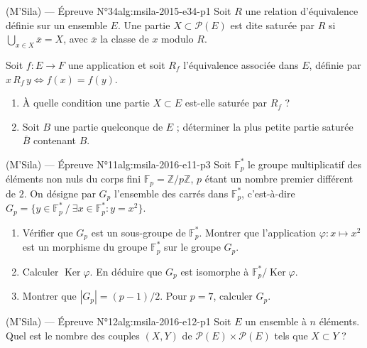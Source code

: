 \begin{problem}{(M'Sila) — Épreuve N°34}{alg:msila-2015-e34-p1}
Soit $R$ une relation d'équivalence définie sur un ensemble $E$. Une partie
$X\subset\mathcal P(E)$ est dite saturée par $R$ si
$\bigcup_{x\in X}\overline{x}=X$, avec $\overline{x}$ la classe de $x$ modulo $R$.

Soit $f:E\to F$ une application et soit $R_f$ l'équivalence associée dans $E$,
définie par $x\,R_f\,y\Longleftrightarrow f(x)=f(y)$.
\begin{enumerate}
\item À quelle condition une partie $X\subset E$ est-elle saturée par $R_f$ ?
\item Soit $B$ une partie quelconque de $E$ ; déterminer la plus petite partie
      saturée $\overline B$ contenant $B$.
\end{enumerate}

\end{problem}

\newpage

\begin{problem}{(M'Sila) — Épreuve N°11}{alg:msila-2016-e11-p3}
Soit $\mathbb{F}_p^*$ le groupe multiplicatif des éléments non nuls du corps fini
$\mathbb{F}_p=\mathbb{Z}/p\mathbb{Z}$, $p$ étant un nombre premier différent de $2$.
On désigne par $G_p$ l'ensemble des carrés dans $\mathbb{F}_p^*$, c'est-à-dire
$G_p = \{y \in \mathbb{F}_p^* \ / \ \exists x \in \mathbb{F}_p^* : y = x^2\}$.
\begin{enumerate}
\item Vérifier que $G_p$ est un sous-groupe de $\mathbb{F}_p^*$. Montrer que
      l'application $\varphi : x \mapsto x^2$ est un morphisme du groupe
      $\mathbb{F}_p^*$ sur le groupe $G_p$.
\item Calculer $\operatorname{Ker}\varphi$. En déduire que $G_p$ est isomorphe à
      $\mathbb{F}_p^*/\operatorname{Ker}\varphi$.
\item Montrer que $|G_p| = (p - 1)/2$. Pour $p = 7$, calculer $G_p$.
\end{enumerate}

\end{problem}

\newpage

\begin{problem}{(M'Sila) — Épreuve N°12}{alg:msila-2016-e12-p1}
Soit $E$ un ensemble à $n$ éléments. Quel est le nombre des couples $(X, Y)$ de
$\mathcal{P}(E) \times \mathcal{P}(E)$ tels que $X \subset Y$ ?

\end{problem}

